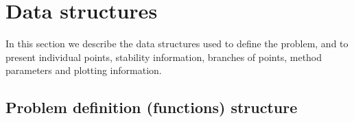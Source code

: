 \documentclass[10pt]{scrartcl}
\newcommand{\parm}[1]{\mathsf{#1}}
\newcommand{\define}[1]{\emph{#1}}
\begin{document}
\section{Data structures}\label{data_structures}

In this section we describe the data structures used to define the
problem, and to present individual points, stability information, branches
of points, method parameters and plotting information.


\subsection{Problem definition (functions) structure}
\label{sec:funcs:struct}
\end{document}
